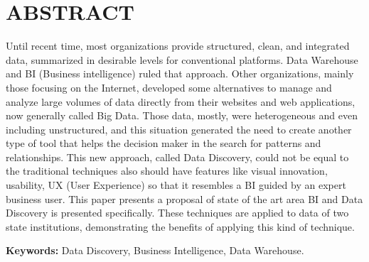 \vspace*{1\baselineskip}

\chapter*{\centering ABSTRACT}
	Until recent time, most organizations provide structured, clean, and integrated data, summarized in desirable levels for conventional platforms. Data Warehouse and BI (Business intelligence) ruled that approach. Other organizations, mainly those focusing on the Internet, developed some alternatives to manage and analyze large volumes of data directly from their websites and web applications, now generally called Big Data. Those data, mostly, were heterogeneous and even including unstructured, and this situation generated the need to create another type of tool that helps the decision maker in the search for patterns and relationships. This new approach, called Data Discovery, could not be equal to the traditional techniques also should have features like visual innovation, usability, UX (User Experience) so that it resembles a BI guided by an expert business user. This paper presents a proposal of state of the art area BI and Data Discovery is presented specifically. These techniques are applied to data of two state institutions, demonstrating the benefits of applying this kind of technique.


\vspace*{1\baselineskip}
\textbf{Keywords:} Data Discovery, Business Intelligence, Data Warehouse.